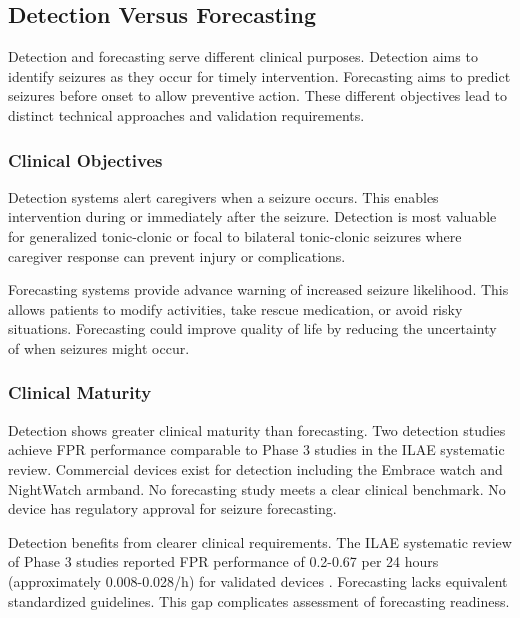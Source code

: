 \subsection{Detection Versus Forecasting}
\label{sec:detection-vs-forecasting}

Detection and forecasting serve different clinical purposes. Detection aims to identify seizures as they occur for timely intervention. Forecasting aims to predict seizures before onset to allow preventive action. These different objectives lead to distinct technical approaches and validation requirements.

\subsubsection{Clinical Objectives}

Detection systems alert caregivers when a seizure occurs. This enables intervention during or immediately after the seizure. Detection is most valuable for generalized tonic-clonic or focal to bilateral tonic-clonic seizures where caregiver response can prevent injury or complications.

Forecasting systems provide advance warning of increased seizure likelihood. This allows patients to modify activities, take rescue medication, or avoid risky situations. Forecasting could improve quality of life by reducing the uncertainty of when seizures might occur.

\subsubsection{Clinical Maturity}

Detection shows greater clinical maturity than forecasting. Two detection studies achieve FPR performance comparable to Phase 3 studies in the ILAE systematic review. Commercial devices exist for detection including the Embrace watch and NightWatch armband. No forecasting study meets a clear clinical benchmark. No device has regulatory approval for seizure forecasting.

Detection benefits from clearer clinical requirements. The ILAE systematic review of Phase 3 studies reported FPR performance of 0.2-0.67 per 24 hours (approximately 0.008-0.028/h) for validated devices \parencite{beniczkyAutomatedSeizureDetection2021}. Forecasting lacks equivalent standardized guidelines. This gap complicates assessment of forecasting readiness.

